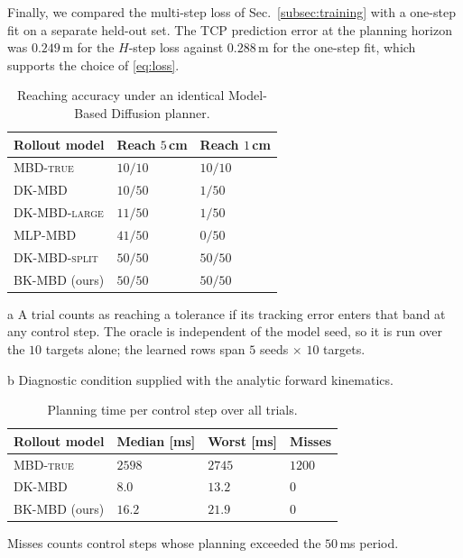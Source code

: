 \documentclass[letterpaper,10pt,conference]{ieeeconf}
\newcommand{\mbdtrue}{\textsc{MBD-true}}
\newcommand{\dkmbd}{\textsc{DK-MBD}}
\newcommand{\dksplit}{\textsc{DK-MBD-split}}
\newcommand{\bkmbd}{\textsc{BK-MBD}}
\begin{document}
Finally, we compared the multi-step loss of Sec.~\ref{subsec:training} with a one-step fit on a separate held-out set.
The TCP prediction error at the planning horizon was $0.249$\,m for the $H$-step loss against $0.288$\,m for the one-step fit, which supports the choice of \eqref{eq:loss}.

\begin{table}[t]
\centering
\begin{threeparttable}
\caption{Reaching accuracy under an identical Model-Based Diffusion planner.}
\label{tab:franka}
\footnotesize
\setlength{\tabcolsep}{4pt}
\begin{tabularx}{\linewidth}{l Y Y}
\toprule
Rollout model & Reach $5$\,cm & Reach $1$\,cm \\
\midrule
\mbdtrue{} & $10/10$ & $10/10$ \\
\dkmbd{} & $10/50$ & $1/50$ \\
\textsc{DK-MBD-large} & $11/50$ & $1/50$ \\
\textsc{MLP-MBD} & $41/50$ & $0/50$ \\
\dksplit{} & $50/50$ & $50/50$ \\
\bkmbd{} (ours) & $50/50$ & $50/50$ \\
\bottomrule
\end{tabularx}
\begin{tablenotes}[flushleft]\scriptsize
\item[a] A trial counts as reaching a tolerance if its tracking error enters
that band at any control step. The oracle is independent of the model seed, so
it is run over the $10$ targets alone; the learned rows span $5$ seeds
$\times$ $10$ targets.
\item[b] Diagnostic condition supplied with the analytic forward kinematics.
\end{tablenotes}
\end{threeparttable}
\end{table}

\begin{table}[t]
\centering
\begin{threeparttable}
\caption{Planning time per control step over all trials.}
\label{tab:latency}
\footnotesize
\begin{tabularx}{\linewidth}{l Y Y Y}
\toprule
Rollout model & Median [ms] & Worst [ms] & Misses \\
\midrule
\mbdtrue{} & $2598$ & $2745$ & $1200$ \\
\dkmbd{} & $8.0$ & $13.2$ & $0$ \\
\bkmbd{} (ours) & $16.2$ & $21.9$ & $0$ \\
\bottomrule
\end{tabularx}
\begin{tablenotes}[flushleft]\scriptsize
\item Misses counts control steps whose planning exceeded the $50$\,ms period.
\end{tablenotes}
\end{threeparttable}
\end{table}
\end{document}

